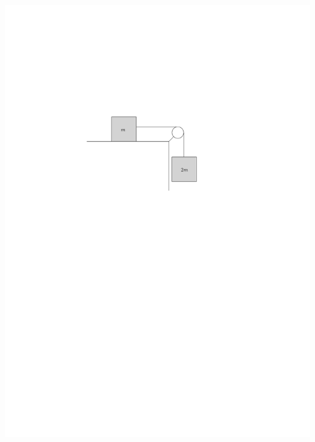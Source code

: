 \documentclass[12pt]{report}
\begin{document}
\begin{enumerate}
\vspace{2cm}
\includegraphics{flatMassPulley}

\vfill
\end{enumerate}
\end{document}
